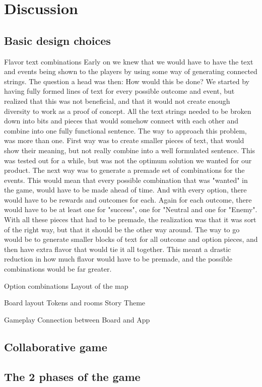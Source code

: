 \section{Discussion}
\subsection{Basic design choices} 
Flavor text combinations
Early on we knew that we would have to have the text and events being shown to the players by using some way of generating connected strings. The question a head was then: How would this be done?
We started by having fully formed lines of text for every possible outcome and event, but realized that this was not beneficial, and that it would not create enough diversity to work as a proof of concept.
All the text strings needed to be broken down into bits and pieces that would somehow connect with each other and combine into one fully functional sentence. 
The way to approach this problem, was more than one.
First way was to create smaller pieces of text, that would show their meaning, but not really combine into a well formulated sentence. This was tested out for a while, but was not the optimum solution we wanted for our product.
The next way was to generate a premade set of combinations for the events. This would mean that every possible combination that was "wanted" in the game, would have to be made ahead of time. And with every option, there would have to be rewards and outcomes for each. Again for each outcome, there would have to be at least one for "success", one for "Neutral and one for "Enemy". With all these pieces that had to be premade, the realization was that it was sort of the right way, but that it should be the other way around. The way to go would be to generate smaller blocks of text for all outcome and option pieces, and then have extra flavor that would tie it all together. This meant a drastic reduction in how much flavor would have to be premade, and the possible combinations would be far greater. 




Option combinations
Layout of the map

Board layout
Tokens and rooms
Story
Theme

Gameplay
Connection between Board and App


\subsection{Collaborative game} 
\subsection{The 2 phases of the game}
